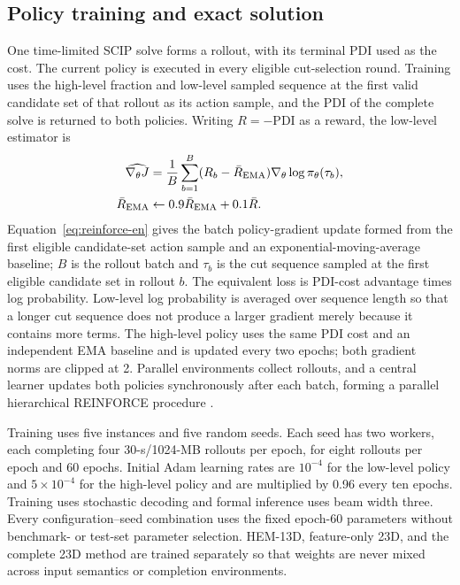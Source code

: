 \documentclass[journal]{IEEEtran}
\newcommand{\pdi}{\mathrm{PDI}}
\begin{document}
\subsection{Policy training and exact solution}

One time-limited SCIP solve forms a rollout, with its terminal PDI used as the cost. The current policy is executed in every eligible cut-selection round. Training uses the high-level fraction and low-level sampled sequence at the first valid candidate set of that rollout as its action sample, and the PDI of the complete solve is returned to both policies. Writing $R=-\pdi$ as a reward, the low-level estimator is
\begin{equation}
\begin{aligned}
\widehat{\nabla_\theta J}
&=\frac1B\sum_{b=1}^B(R_b-\bar R_{\rm EMA})
\nabla_\theta\log\pi_\theta(\tau_b),\\
\bar R_{\rm EMA}&\leftarrow0.9\bar R_{\rm EMA}+0.1\bar R.
\end{aligned}
\label{eq:reinforce-en}
\end{equation}
Equation~\eqref{eq:reinforce-en} gives the batch policy-gradient update formed from the first eligible candidate-set action sample and an exponential-moving-average baseline; $B$ is the rollout batch and $\tau_b$ is the cut sequence sampled at the first eligible candidate set in rollout $b$. The equivalent loss is PDI-cost advantage times log probability. Low-level log probability is averaged over sequence length so that a longer cut sequence does not produce a larger gradient merely because it contains more terms. The high-level policy uses the same PDI cost and an independent EMA baseline and is updated every two epochs; both gradient norms are clipped at 2. Parallel environments collect rollouts, and a central learner updates both policies synchronously after each batch, forming a parallel hierarchical REINFORCE procedure \cite{williams1992reinforce,mnih2016a3c}.

Training uses five instances and five random seeds. Each seed has two workers, each completing four 30-s/1024-MB rollouts per epoch, for eight rollouts per epoch and 60 epochs. Initial Adam learning rates are $10^{-4}$ for the low-level policy and $5\times10^{-4}$ for the high-level policy and are multiplied by 0.96 every ten epochs. Training uses stochastic decoding and formal inference uses beam width three. Every configuration--seed combination uses the fixed epoch-60 parameters without benchmark- or test-set parameter selection. HEM-13D, feature-only 23D, and the complete 23D method are trained separately so that weights are never mixed across input semantics or completion environments.
\end{document}
